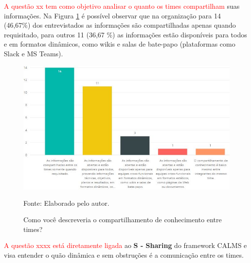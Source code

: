 \documentclass[twoside,english,brazilian]{UNISINOSartigo}
\newcommand{\source}[1]{\caption*{Fonte: {#1}} }
\begin{document}
\textcolor{red}{A questão xx tem como objetivo analisar o quanto os times compartilham} suas informações. Na Figura \ref{fig:compartConhecimento} é possível observar que na organização para 14 (46,67\%) dos entrevistados as informações são compartilhadas apenas quando requisitado, para outros 11 (36,67 \%) as informações estão disponíveis para todos e em formatos dinâmicos, como wikis e salas de bate-papo (plataformas como Slack e MS Teams). 
\begin{figure}[H]
    \centering
    \caption{Como você descreveria o compartilhamento de conhecimento entre times?}
       \includegraphics[scale=.6]{imagens/compartilhamentoConhecimento.JPG}
        \source{Elaborado pelo autor.}
    \label{fig:compartConhecimento}
\end{figure}
\textcolor{red}{A questão xxxx está diretamente ligada} ao \textbf{S - Sharing} do framework CALMS e visa entender o quão dinâmica e sem obstruções é a comunicação entre os times. 
\end{document}
